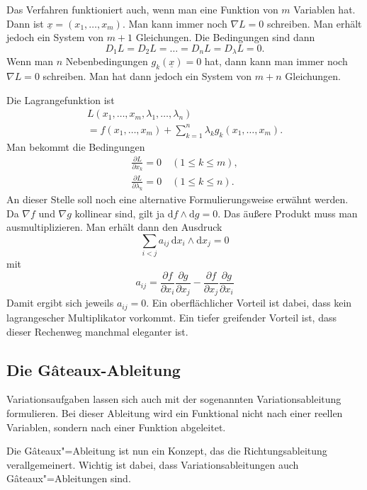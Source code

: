 \documentclass[a4paper,10pt,fleqn,twocolumn,twoside]{article}
\numberwithin{equation}{section}
\begin{document}
Das Verfahren funktioniert auch, wenn man eine Funktion von $m$
Variablen hat. Dann ist $\underline x=(x_1,\ldots,x_m).$
Man kann immer noch $\nabla L=0$ schreiben. Man erhält jedoch ein
System von $m+1$ Gleichungen. Die Bedingungen sind dann
\begin{equation}
D_1 L = D_2 L = \ldots = D_n L = D_\lambda L = 0.
\end{equation}
%
Wenn man $n$ Nebenbedingungen $g_k(\underline x)=0$ hat,
dann kann man immer noch $\nabla L=0$ schreiben.
Man hat dann jedoch ein System von $m+n$ Gleichungen.

Die Lagrangefunktion ist
\begin{gather*}
L(x_1,\ldots,x_m,\lambda_1,\ldots,\lambda_n)\\
= f(x_1,\ldots,x_m)+\sum_{k=1}^n \lambda_k g_k(x_1,\ldots,x_m).
\end{gather*}
Man bekommt die Bedingungen
\begin{gather*}
\frac{\partial L}{\partial x_k}=0 \quad (1\le k\le m),\\
\frac{\partial L}{\partial \lambda_k}=0 \quad (1\le k\le n).
\end{gather*}
An dieser Stelle soll noch eine alternative Formulierungsweise
erwähnt werden. Da $\nabla f$ und $\nabla g$ kollinear sind,
gilt ja $\mathrm df\wedge\mathrm dg=0$. Das äußere Produkt muss
man ausmultiplizieren. Man erhält dann den Ausdruck
\begin{equation}
\sum_{i<j} a_{ij}\,\mathrm dx_i\wedge\mathrm dx_j=0
\end{equation}
mit
\begin{equation}
a_{ij} = \frac{\partial f}{\partial x_i}\frac{\partial g}{\partial x_j}
-\frac{\partial f}{\partial x_j}\frac{\partial g}{\partial x_i}
\end{equation}
Damit ergibt sich jeweils $a_{ij}=0$. Ein oberflächlicher Vorteil
ist dabei, dass kein lagrangescher Multiplikator vorkommt.
Ein tiefer greifender Vorteil ist, dass dieser Rechenweg manchmal
eleganter ist.

\subsection{Die Gâteaux-Ableitung}

Variationsaufgaben lassen sich auch mit der sogenannten
Variationsableitung formulieren. Bei dieser Ableitung wird ein
Funktional nicht nach einer reellen Variablen, sondern nach einer
Funktion abgeleitet.

Die Gâteaux"=Ableitung ist nun ein Konzept, das die Richtungsableitung
verallgemeinert. Wichtig ist dabei, dass Variationsableitungen auch
Gâteaux"=Ableitungen sind.
\end{document}
